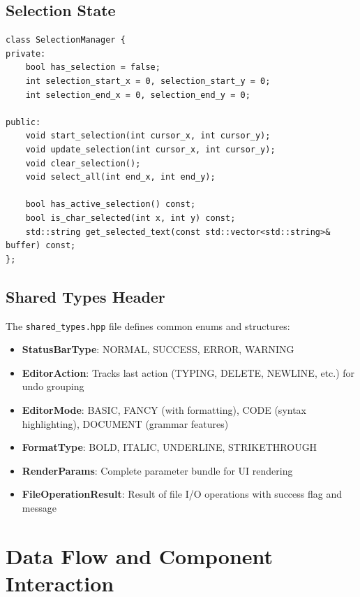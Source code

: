 \documentclass[12pt,a4paper,oneside,openany]{report}
\begin{document}
\section{Selection State}

\begin{lstlisting}
class SelectionManager {
private:
    bool has_selection = false;
    int selection_start_x = 0, selection_start_y = 0;
    int selection_end_x = 0, selection_end_y = 0;
    
public:
    void start_selection(int cursor_x, int cursor_y);
    void update_selection(int cursor_x, int cursor_y);
    void clear_selection();
    void select_all(int end_x, int end_y);
    
    bool has_active_selection() const;
    bool is_char_selected(int x, int y) const;
    std::string get_selected_text(const std::vector<std::string>& buffer) const;
};
\end{lstlisting}

\section{Shared Types Header}

The \texttt{shared\_types.hpp} file defines common enums and structures:

\begin{itemize}
	\item \textbf{StatusBarType}: NORMAL, SUCCESS, ERROR, WARNING
	\item \textbf{EditorAction}: Tracks last action (TYPING, DELETE, NEWLINE, etc.) for undo grouping
	\item \textbf{EditorMode}: BASIC, FANCY (with formatting), CODE (syntax highlighting), DOCUMENT (grammar features)
	\item \textbf{FormatType}: BOLD, ITALIC, UNDERLINE, STRIKETHROUGH
	\item \textbf{RenderParams}: Complete parameter bundle for UI rendering
	\item \textbf{FileOperationResult}: Result of file I/O operations with success flag and message
\end{itemize}

\chapter{Data Flow and Component Interaction}
\end{document}
